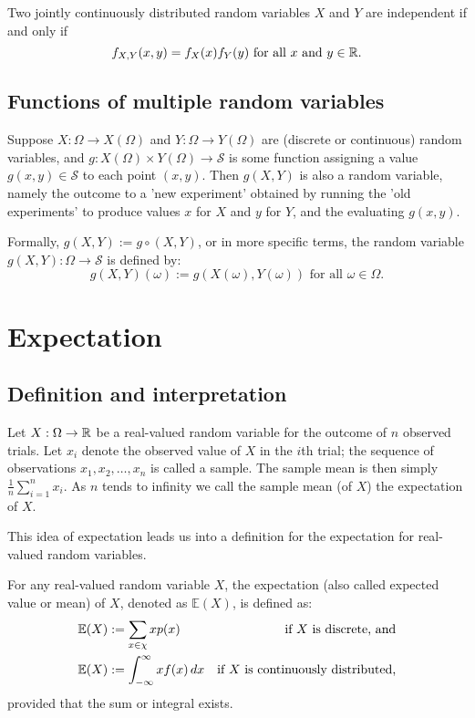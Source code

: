 \documentclass[10pt, a4paper]{article}
\begin{document}
\begin{lemma}
    Two jointly continuously distributed random variables $X$ and $Y$ are independent if and only if
    \[
    f_{X, Y}(x, y) = f_X(x)f_Y(y)\text{ for all $x$ and $y \in \mathbb{R}$}.
    \]
\end{lemma}

\subsection{Functions of multiple random variables}
Suppose $X : \Omega \rightarrow X(\Omega)$ and $Y : \Omega \rightarrow Y(\Omega)$ are
(discrete or continuous)
random variables,
and $g: X(\Omega) \times Y(\Omega) \rightarrow \mathcal{S}$ is some function assigning a value $g(x, y) \in \mathcal{S}$ to each point $(x, y)$.
Then $g(X, Y)$ is also a random variable,
namely the outcome to a 'new experiment' obtained by running the 'old experiments' to produce values $x$ for $X$ and $y$ for $Y$,
and the evaluating $g(x, y)$.

Formally,
$g(X, Y) := g \circ (X, Y)$,
or in more specific terms,
the random variable $g(X, Y) : \Omega \rightarrow \mathcal{S}$ is defined by:
\[
g(X, Y)(\omega) := g(X(\omega), Y(\omega))\text{ for all } \omega \in \Omega.
\]

\newpage

\section{Expectation}

\subsection{Definition and interpretation}
Let $X : \Omega \rightarrow \mathbb{R}$ be a real-valued random variable for the outcome of $n$ observed trials.
Let $x_i$ denote the observed value of $X$ in the $i$th trial;
the sequence of observations $x_1, x_2, \dotsc, x_n$ is called a sample.
The sample mean is then simply $\frac{1}{n}\sum_{i = 1}^{n}x_i$.
As $n$ tends to infinity we call the sample mean
(of $X$)
the expectation of $X$.

This idea of expectation leads us into a definition for the expectation for real-valued random variables.
\begin{definition}[Expectation]
    For any real-valued random variable $X$,
    the expectation
    (also called expected value or mean)
    of $X$,
    denoted as $\mathbb{E}(X)$,
    is defined as:
    \begin{align}
        \mathbb{E}(X) &:= \sum_{x \in \chi}x p(x)&\text{if $X$ is discrete, and} \\
        \mathbb{E}(X) &:= \int_{-\infty}^{\infty}x f(x)\,dx&\text{if $X$ is continuously distributed,}
    \end{align}
    provided that the sum or integral exists.
\end{definition}
\end{document}
